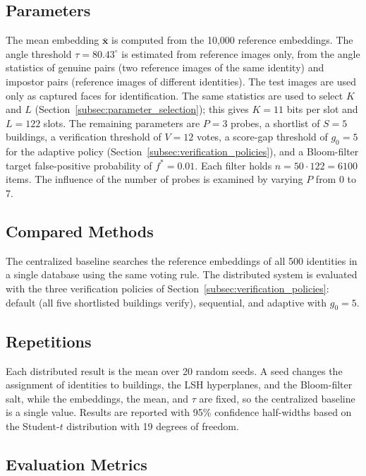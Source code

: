 \documentclass[pdflatex,sn-mathphys-num]{sn-jnl}%
\theoremstyle{thmstyleone}%
\theoremstyle{thmstyletwo}%
\theoremstyle{thmstylethree}%
\begin{document}
\subsection{Parameters}

The mean embedding $\bar{\mathbf{x}}$ is computed from the 10,000 reference embeddings. The angle threshold $\tau=80.43^{\circ}$ is estimated from reference images only, from the angle statistics of genuine pairs (two reference images of the same identity) and impostor pairs (reference images of different identities). The test images are used only as captured faces for identification. The same statistics are used to select $K$ and $L$ (Section~\ref{subsec:parameter_selection}); this gives $K=11$ bits per slot and $L=122$ slots. The remaining parameters are $P=3$ probes, a shortlist of $S=5$ buildings, a verification threshold of $V=12$ votes, a score-gap threshold of $g_0=5$ for the adaptive policy (Section~\ref{subsec:verification_policies}), and a Bloom-filter target false-positive probability of $f^*=0.01$. Each filter holds $n=50\cdot122=6100$ items. The influence of the number of probes is examined by varying $P$ from 0 to 7.

\subsection{Compared Methods}

The centralized baseline searches the reference embeddings of all 500 identities in a single database using the same voting rule. The distributed system is evaluated with the three verification policies of Section~\ref{subsec:verification_policies}: default (all five shortlisted buildings verify), sequential, and adaptive with $g_0=5$.

\subsection{Repetitions}

Each distributed result is the mean over 20 random seeds. A seed changes the assignment of identities to buildings, the LSH hyperplanes, and the Bloom-filter salt, while the embeddings, the mean, and $\tau$ are fixed, so the centralized baseline is a single value. Results are reported with 95\% confidence half-widths based on the Student-$t$ distribution with 19 degrees of freedom.

\subsection{Evaluation Metrics}
\end{document}

